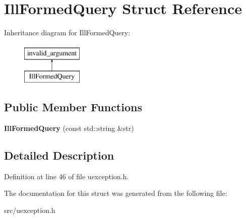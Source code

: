 \hypertarget{struct_ill_formed_query}{}\section{Ill\+Formed\+Query Struct Reference}
\label{struct_ill_formed_query}
Inheritance diagram for Ill\+Formed\+Query\+:\begin{figure}[H]
\begin{center}
\leavevmode
\includegraphics[height=2.000000cm]{struct_ill_formed_query}
\end{center}
\end{figure}
\subsection*{Public Member Functions}
\begin{DoxyCompactItemize}
\item 
\mbox{\label{struct_ill_formed_query_a1c561f3dcf8ff9592e9a00f9bff5ee11}} 
{\bfseries Ill\+Formed\+Query} (const std\+::string \&str)
\end{DoxyCompactItemize}


\subsection{Detailed Description}


Definition at line 46 of file uexception.\+h.



The documentation for this struct was generated from the following file\+:\begin{DoxyCompactItemize}
\item 
src/uexception.\+h\end{DoxyCompactItemize}
